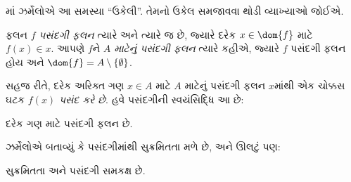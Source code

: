 \citeyear{Zermelo1904}માં ઝર્મેલોએ આ
સમસ્યા ``ઉકેલી''. તેમનો ઉકેલ સમજાવવા
થોડી વ્યાખ્યાઓ જોઈએ.

\begin{defn}
ફલન $f$ \emph{પસંદગી ફલન} ત્યારે અને
ત્યારે જ છે, જ્યારે દરેક $x \in \dom{f}$
માટે $f(x) \in x$. આપણે $f$ને
\emph{$A$ માટેનું પસંદગી ફલન} ત્યારે કહીએ,
જ્યારે $f$ પસંદગી ફલન હોય અને
$\dom{f} = A \setminus \{\emptyset\}$.
\end{defn}

સહજ રીતે, દરેક અરિક્ત ગણ $x \in A$ માટે
$A$ માટેનું પસંદગી ફલન $x$માંથી એક ચોક્કસ ઘટક
$f(x)$ \emph{પસંદ કરે છે}. હવે પસંદગીની
સ્વયંસિદ્ધિ આ છે:

\begin{axiom}[પસંદગી]
	દરેક ગણ માટે પસંદગી ફલન છે.
\end{axiom}

ઝર્મેલોએ બતાવ્યું કે પસંદગીમાંથી સુક્રમિતતા
મળે છે, અને ઊલટું પણ:

\begin{thm}[$\ZF$માં]
સુક્રમિતતા અને પસંદગી સમકક્ષ છે.
\end{thm}

